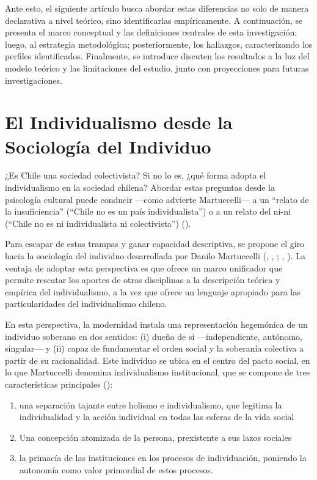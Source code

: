 \documentclass[
  12pt,
  letterpaper,
  DIV=11,
  numbers=noendperiod]{scrartcl}
\begin{document}
Ante esto, el siguiente artículo busca abordar estas diferencias no solo
de manera declarativa a nivel teórico, sino identificarlas
empíricamente. A continuación, se presenta el marco conceptual y las
definiciones centrales de esta investigación; luego, al estrategia
metodológica; posteriormente, los hallazgos, caracterizando los perfiles
identificados. Finalmente, se introduce discuten los resultados a la luz
del modelo teórico y las limitaciones del estudio, junto con
proyecciones para futuras investigaciones.

\section{El Individualismo desde la Sociología del
Individuo}\label{el-individualismo-desde-la-sociologuxeda-del-individuo}

¿Es Chile una sociedad colectivista? Si no lo es, ¿qué forma adopta el
individualismo en la sociedad chilena? Abordar estas preguntas desde la
psicología cultural puede conducir ---como advierte Martuccelli--- a un
``relato de la insuficiencia'' (``Chile no es un país individualista'')
o a un relato del ni-ni (``Chile no es ni individualista ni
colectivista'') ().

Para escapar de estas trampas y ganar capacidad descriptiva, se propone
el giro hacia la sociología del individuo desarrollada por Danilo
Martuccelli (,
, ;
,
). La ventaja de adoptar esta
perspectiva es que ofrece un marco unificador que permite rescatar los
aportes de otras disciplinas a la descripción teórica y empírica del
individualismo, a la vez que ofrece un lenguaje apropiado para las
particularidades del individualismo chileno.

En esta perspectiva, la modernidad instala una representación hegemónica
de un individuo soberano en dos sentidos: (i) dueño de sí
---independiente, autónomo, singular--- y (ii) capaz de fundamentar el
orden social y la soberanía colectiva a partir de su racionalidad. Este
individuo se ubica en el centro del pacto social, en lo que Martuccelli
denomina individualismo institucional, que se compone de tres
características principales ():

\begin{enumerate}
\def\labelenumi{\roman{enumi})}
\item
  una separación tajante entre holismo e individualismo, que legitima la
  individualidad y la acción individual en todas las esferas de la vida
  social
\item
  Una concepción atomizada de la persona, prexistente a sus lazos
  sociales
\item
  la primacía de las instituciones en los procesos de individuación,
  poniendo la autonomía como valor primordial de estos procesos.
\end{enumerate}
\end{document}
